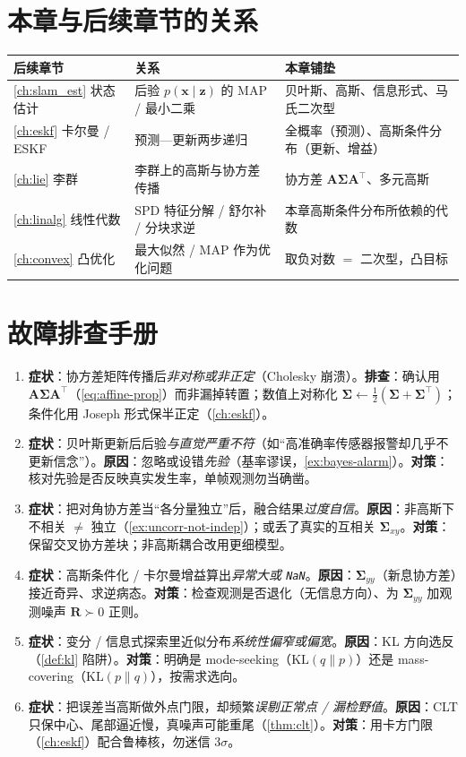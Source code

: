 \section*{本章与后续章节的关系}
\begin{table}[H]\centering\small
\begin{tabular}{lll}
\toprule
后续章节 & 关系 & 本章铺垫 \\
\midrule
\cref{ch:slam_est} 状态估计 & 后验 $p(\mathbf{x}\mid\mathbf{z})$ 的 MAP / 最小二乘 & 贝叶斯、高斯、信息形式、马氏二次型 \\
\cref{ch:eskf} 卡尔曼 / ESKF & 预测—更新两步递归 & 全概率（预测）、高斯条件分布（更新、增益）\\
\cref{ch:lie} 李群 & 李群上的高斯与协方差传播 & 协方差 $\mathbf{A}\boldsymbol{\Sigma}\mathbf{A}^\top$、多元高斯 \\
\cref{ch:linalg} 线性代数 & SPD 特征分解 / 舒尔补 / 分块求逆 & 本章高斯条件分布所依赖的代数 \\
\cref{ch:convex} 凸优化 & 最大似然 / MAP 作为优化问题 & 取负对数 $=$ 二次型，凸目标 \\
\bottomrule
\end{tabular}
\end{table}

\section*{故障排查手册}
\begin{enumerate}
  \item \textbf{症状}：协方差矩阵传播后\emph{非对称或非正定}（Cholesky 崩溃）。\textbf{排查}：确认用 $\mathbf{A}\boldsymbol{\Sigma}\mathbf{A}^\top$（\cref{eq:affine-prop}）而非漏掉转置；数值上对称化 $\boldsymbol{\Sigma}\leftarrow\tfrac12(\boldsymbol{\Sigma}+\boldsymbol{\Sigma}^\top)$；条件化用 Joseph 形式保半正定（\cref{ch:eskf}）。
  \item \textbf{症状}：贝叶斯更新后后验\emph{与直觉严重不符}（如“高准确率传感器报警却几乎不更新信念”）。\textbf{原因}：忽略或设错\emph{先验}（基率谬误，\cref{ex:bayes-alarm}）。\textbf{对策}：核对先验是否反映真实发生率，单帧观测勿当确凿。
  \item \textbf{症状}：把对角协方差当“各分量独立”后，融合结果\emph{过度自信}。\textbf{原因}：非高斯下不相关 $\ne$ 独立（\cref{ex:uncorr-not-indep}）；或丢了真实的互相关 $\boldsymbol{\Sigma}_{xy}$。\textbf{对策}：保留交叉协方差块；非高斯耦合改用更细模型。
  \item \textbf{症状}：高斯条件化 / 卡尔曼增益算出\emph{异常大或 \texttt{NaN}}。\textbf{原因}：$\boldsymbol{\Sigma}_{yy}$（新息协方差）接近奇异、求逆病态。\textbf{对策}：检查观测是否退化（无信息方向）、为 $\boldsymbol{\Sigma}_{yy}$ 加观测噪声 $\mathbf{R}\succ0$ 正则。
  \item \textbf{症状}：变分 / 信息式探索里近似分布\emph{系统性偏窄或偏宽}。\textbf{原因}：KL 方向选反（\cref{def:kl} 陷阱）。\textbf{对策}：明确是 mode-seeking（$\mathrm{KL}(q\|p)$）还是 mass-covering（$\mathrm{KL}(p\|q)$），按需求选向。
  \item \textbf{症状}：把误差当高斯做外点门限，却频繁\emph{误剔正常点 / 漏检野值}。\textbf{原因}：CLT 只保中心、尾部逼近慢，真噪声可能重尾（\cref{thm:clt}）。\textbf{对策}：用卡方门限（\cref{ch:eskf}）配合鲁棒核，勿迷信 $3\sigma$。
\end{enumerate}
